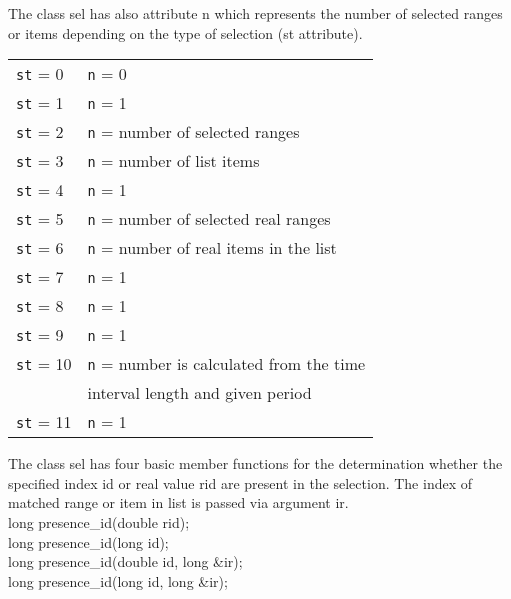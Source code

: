 The class {\sf sel} has also attribute {\sf n} which represents the number of 
selected ranges or items depending on the type of selection ({\sf st} attribute).

\begin{center}
\begin{tabular}{|l|l|}
\hline
{\tt st} = 0           & {\tt n} = 0
\\
{\tt st} = 1           & {\tt n} = 1
\\ 
{\tt st} = 2           & {\tt n} = number of selected ranges
\\
{\tt st} = 3           & {\tt n} = number of list items
\\
{\tt st} = 4           & {\tt n} = 1
\\
{\tt st} = 5           & {\tt n} = number of selected real ranges
\\
{\tt st} = 6           & {\tt n} = number of real items in the list
\\
{\tt st} = 7           & {\tt n} = 1
\\
{\tt st} = 8           & {\tt n} = 1
\\
{\tt st} = 9           & {\tt n} = 1
\\
{\tt st} = 10          & {\tt n} = number is calculated from the time \\
                       & interval length and given period
\\
{\tt st} = 11          & {\tt n} = 1
\\
\hline
\end{tabular}
\end{center}

The class {\sf sel} has four basic member functions for the determination whether the
specified index {\sf id} or real value {\sf rid} are present in the selection.
The index of matched range or item in list is passed via argument {\sf ir}.\\

{\sf
  \indent \hspace{20mm} long presence\_id(double rid);\\
  \indent \hspace{20mm} long presence\_id(long id);\\
  \indent \hspace{20mm} long presence\_id(double id, long \&ir);\\
  \indent \hspace{20mm} long presence\_id(long id, long \&ir);\\
}

